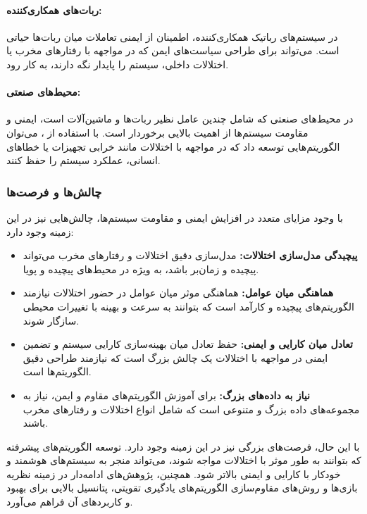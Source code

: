 \paragraph{ربات‌های همکاری‌کننده:} در سیستم‌های رباتیک همکاری‌کننده، اطمینان از ایمنی تعاملات میان ربات‌ها حیاتی است.  می‌تواند برای طراحی سیاست‌های ایمن که در مواجهه با رفتارهای مخرب یا اختلالات داخلی، سیستم را پایدار نگه دارند، به کار رود.

\paragraph{محیط‌های صنعتی:} در محیط‌های صنعتی که شامل چندین عامل نظیر ربات‌ها و ماشین‌آلات است، ایمنی و مقاومت سیستم‌ها از اهمیت بالایی برخوردار است. با استفاده از ، می‌توان الگوریتم‌هایی توسعه داد که در مواجهه با اختلالات مانند خرابی تجهیزات یا خطاهای انسانی، عملکرد سیستم را حفظ کنند.

\subsubsection{چالش‌ها و فرصت‌ها}

با وجود مزایای متعدد  در افزایش ایمنی و مقاومت سیستم‌ها، چالش‌هایی نیز در این زمینه وجود دارد:

\begin{itemize}
	\item \textbf{پیچیدگی مدل‌سازی اختلالات:} مدل‌سازی دقیق اختلالات و رفتارهای مخرب می‌تواند پیچیده و زمان‌بر باشد، به ویژه در محیط‌های پیچیده و پویا.
	
	\item \textbf{هماهنگی میان عوامل:} هماهنگی موثر میان عوامل در حضور اختلالات نیازمند الگوریتم‌های پیچیده و کارآمد است که بتوانند به سرعت و بهینه با تغییرات محیطی سازگار شوند.
	
	\item \textbf{تعادل میان کارایی و ایمنی:} حفظ تعادل میان بهینه‌سازی کارایی سیستم و تضمین ایمنی در مواجهه با اختلالات یک چالش بزرگ است که نیازمند طراحی دقیق الگوریتم‌ها است.
	
	\item \textbf{نیاز به داده‌های بزرگ:} برای آموزش الگوریتم‌های مقاوم و ایمن، نیاز به مجموعه‌های داده بزرگ و متنوعی است که شامل انواع اختلالات و رفتارهای مخرب باشند.
\end{itemize}

با این حال، فرصت‌های بزرگی نیز در این زمینه وجود دارد. توسعه الگوریتم‌های پیشرفته  که بتوانند به طور موثر با اختلالات مواجه شوند، می‌تواند منجر به سیستم‌های هوشمند و خودکار با کارایی و ایمنی بالاتر شود. همچنین، پژوهش‌های ادامه‌دار در زمینه نظریه بازی‌ها و روش‌های مقاوم‌سازی الگوریتم‌های یادگیری تقویتی، پتانسیل بالایی برای بهبود  و کاربردهای آن فراهم می‌آورد.

